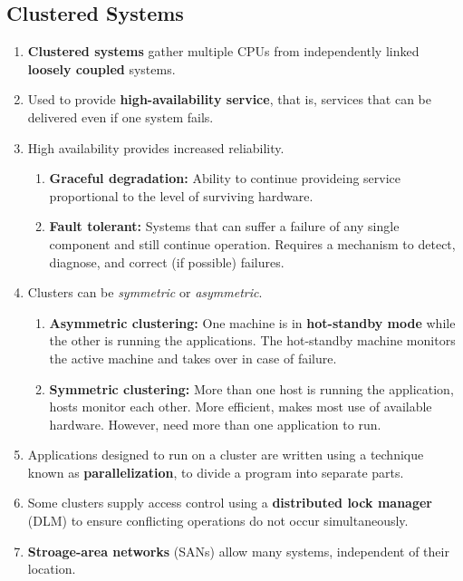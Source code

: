 \documentclass[journal,12pt,twocolumn]{IEEEtran}
\begin{document}
\subsection{Clustered Systems}
\begin{enumerate}
    \item \textbf{Clustered systems} gather multiple CPUs from independently 
    linked \textbf{loosely coupled} systems.
    \item Used to provide \textbf{high-availability service}, that is, services 
    that can be delivered even if one system fails.
    \item High availability provides increased reliability.
    \begin{enumerate}
        \item \textbf{Graceful degradation:} Ability to continue provideing service proportional to the level of surviving hardware.
        \item \textbf{Fault tolerant:} Systems that can suffer a failure of any single component and still continue operation. Requires a mechanism to detect, diagnose, and correct (if possible) failures.
    \end{enumerate}
    \item Clusters can be \textit{symmetric} or \textit{asymmetric}.
    \begin{enumerate}
      \item \textbf{Asymmetric clustering:} One machine is in \textbf{hot-standby 
      mode} while the other is running the applications. The hot-standby machine 
      monitors the active machine and takes over in case of failure.
      \item \textbf{Symmetric clustering:} More than one host is running the 
      application, hosts monitor each other. More efficient, makes most use of 
      available hardware. However, need more than one application to run.
    \end{enumerate}
    \item Applications designed to run on a cluster are written using a 
    technique known as \textbf{parallelization}, to divide a program into 
    separate parts.
    \item Some clusters supply access control using a \textbf{distributed lock 
    manager} (DLM) to ensure conflicting operations do not occur simultaneously.
    \item \textbf{Stroage-area networks} (SANs) allow many systems, independent 
    of their location.
\end{enumerate}
\end{document}
